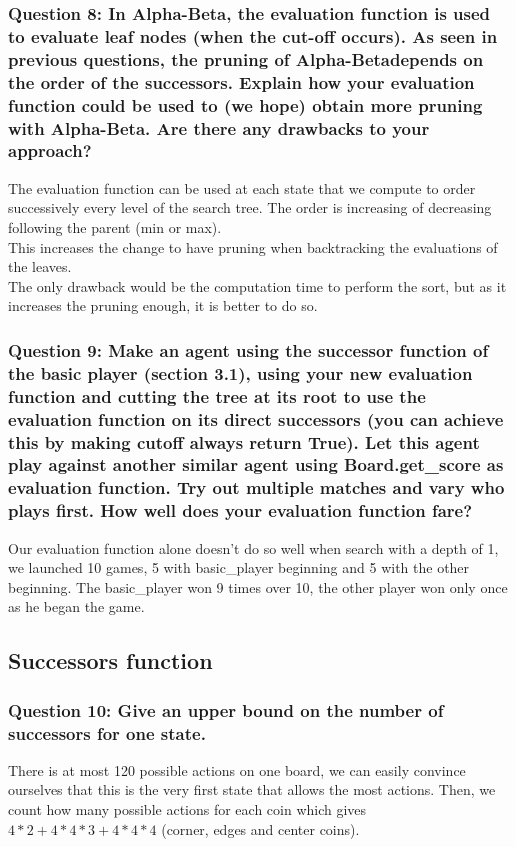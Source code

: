 \documentclass[a4paper,10pt]{article}
\begin{document}
				\subsubsection{Question 8: In Alpha-Beta, the evaluation function is used to evaluate leaf nodes (when the cut-off occurs). As seen in previous questions, the pruning of Alpha-Betadepends on the order of the successors. Explain how your evaluation function could be used to (we hope) obtain more pruning with Alpha-Beta. Are there any drawbacks to your approach?}
					The evaluation function can be used at each state that we compute to order successively every level of the search tree. The order is increasing of decreasing following the parent (min or max).\\
					This increases the change to have pruning when backtracking the evaluations of the leaves.\\
					The only drawback would be the computation time to perform the sort, but as it increases the pruning enough, it is better to do so.
				\subsubsection{Question 9: Make an agent using the successor function of the basic player (section 3.1), using your new evaluation function and cutting the tree at its root to use the evaluation function on its direct successors (you can achieve this by making cutoff always return True). Let this agent play against another similar agent using Board.get\_score as evaluation function. Try out multiple matches and vary who plays first. How well does your evaluation function fare?}
					Our evaluation function alone doesn't do so well when search with a depth of 1, we launched 10 games, 5 with basic_player beginning and 5 with the other beginning. The basic_player won 9 times over 10, the other player won only once as he began the game.
			
			\subsection{Successors function}
				\subsubsection{Question 10: Give an upper bound on the number of successors for one state.}
					There is at most 120 possible actions on one board, we can easily convince ourselves that this is the very first state that allows the most actions. Then, we count how many possible actions for each coin which gives $4*2+4*4*3+4*4*4$ (corner, edges and center coins).
\end{document}
